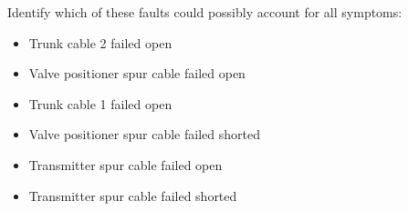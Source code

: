 Identify which of these faults could possibly account for all symptoms:

\begin{itemize}
\item{} Trunk cable 2 failed open
\vskip 5pt 
\item{} Valve positioner spur cable failed open
\vskip 5pt 
\item{} Trunk cable 1 failed open
\vskip 5pt 
\item{} Valve positioner spur cable failed shorted
\vskip 5pt 
\item{} Transmitter spur cable failed open
\vskip 5pt 
\item{} Transmitter spur cable failed shorted
\end{itemize}





